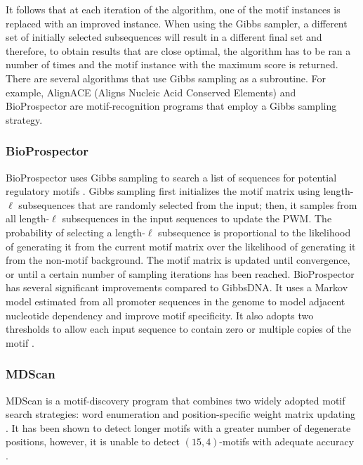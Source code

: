 It follows that at each iteration of the algorithm, one of the motif instances is replaced with an improved instance.  When using the Gibbs sampler, a different set of initially selected subsequences will result in a different final set and therefore, to obtain results that are close optimal, the algorithm has to be ran a number of times and the motif instance with the maximum score is returned.  There are several algorithms that use Gibbs sampling as a subroutine.  For example, AlignACE (Aligns Nucleic Acid Conserved Elements) \cite{RHEC} and BioProspector \cite{LBL} are motif-recognition programs that employ a Gibbs sampling strategy.   

\subsubsection{BioProspector}

BioProspector uses Gibbs sampling to search a list of sequences for potential regulatory motifs \cite{LBL}. Gibbs sampling first initializes the motif matrix using length-$\ell$ subsequences that are randomly selected from the input; then, it samples from all length-$\ell$ subsequences in the input sequences to update the PWM. The probability of selecting a length-$\ell$ subsequence is proportional to the likelihood of generating it from the current motif matrix over the likelihood of generating it from the non-motif background. The motif matrix is updated until convergence, or until a certain number of sampling iterations has been reached. BioProspector has several significant improvements compared to GibbsDNA. It uses a Markov model estimated from all promoter sequences in the genome to model adjacent nucleotide dependency and improve motif specificity. It also adopts two thresholds to allow each input sequence to contain zero or multiple copies of the motif \cite{LBL}.

\subsubsection{MDScan}

MDScan \cite{LBL02} is a motif-discovery program that combines two widely adopted motif search strategies: word enumeration \cite{bussemaker,ST03,vanHelden,vilo} and position-specific weight matrix updating \cite{BE95,HHS90,LBL}.  It has been shown to detect longer motifs with a greater number of degenerate positions, however, it is unable to detect $(15, 4)$-motifs with adequate accuracy \cite{LBL02}.
  
